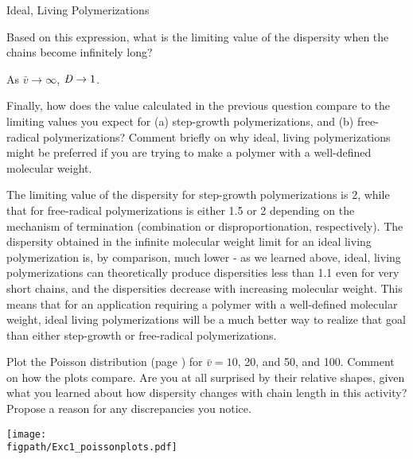 \begin{activity}{Ideal, Living Polymerizations}
\begin{ctqs}
	\clearpage
	\question Based on this expression, what is the limiting value of the dispersity when the chains become infinitely long?
		
		\begin{solution}[0.5in]{}
			As $\bar v \to \infty$, $\PDImath \to 1$.
		\end{solution}
	
	\question Finally, how does the value calculated in the previous question compare to the limiting values you expect for (a) step-growth polymerizations, and (b) free-radical polymerizations?  Comment briefly on why ideal, living polymerizations might be preferred if you are trying to make a polymer with a well-defined molecular weight.
		
		\begin{solution}[1.5in]{}
			The limiting value of the dispersity for step-growth polymerizations is 2, while that for free-radical polymerizations is either 1.5 or 2 depending on the mechanism of termination (combination or disproportionation, respectively).  The dispersity obtained in the infinite molecular weight limit for an ideal living polymerization is, by comparison, much lower - as we learned above, ideal, living polymerizations can theoretically produce dispersities less than 1.1 even for very short chains,  and the dispersities decrease with increasing molecular weight.  This means that for an application requiring a polymer with a well-defined molecular weight, ideal living polymerizations will be a much better way to realize that goal than either step-growth or free-radical polymerizations.
		\end{solution}
	
\end{ctqs}



\begin{exercises}

	\exercise Plot the Poisson distribution (page \pageref{\labelbase:infobox:poisson}) for $\bar v = 10$, 20, and 50, and 100.  Comment on how the plots compare.  Are you at all surprised by their relative shapes, given what you learned about how dispersity changes with chain length in this activity?  Propose a reason for any discrepancies you notice.
	
		\begin{solution}{}
			\centerline{\texttt{[image: \\figpath/Exc1\_poissonplots.pdf]}}
			

\end{solution}
\end{exercises}
\end{activity}
